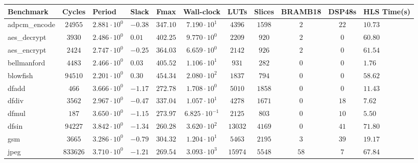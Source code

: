 \begin{tabular}{|l|c|HHc|c|c|c|c|cH|}
\hline
Benchmark     & Cycles       & Period                 & Slack     & Fmax       & Wall-clock              & LUTs      & Slices    & BRAMB18 & DSP48s  & HLS Time(s) \\
\hline
adpcm\_encode & $ 24955    $ & $ 2.881 \cdot 10^{0} $ & $ -0.38 $ & $ 347.10 $ & $ 7.190 \cdot 10^{1}  $ & $ 4396  $ & $ 1598  $ & $ 2   $ & $ 22  $ & $ 10.73   $ \\
aes\_decrypt  & $ 3930     $ & $ 2.486 \cdot 10^{0} $ & $ 0.01  $ & $ 402.25 $ & $ 9.770 \cdot 10^{0}  $ & $ 2209  $ & $ 920   $ & $ 2   $ & $ 0   $ & $ 60.80   $ \\
aes\_encrypt  & $ 2424     $ & $ 2.747 \cdot 10^{0} $ & $ -0.25 $ & $ 364.03 $ & $ 6.659 \cdot 10^{0}  $ & $ 2142  $ & $ 926   $ & $ 2   $ & $ 0   $ & $ 61.54   $ \\
bellmanford   & $ 4483     $ & $ 2.466 \cdot 10^{0} $ & $ 0.03  $ & $ 405.52 $ & $ 1.106 \cdot 10^{1}  $ & $ 931   $ & $ 282   $ & $ 0   $ & $ 0   $ & $ 1.76    $ \\
blowfish      & $ 94510    $ & $ 2.201 \cdot 10^{0} $ & $ 0.30  $ & $ 454.34 $ & $ 2.080 \cdot 10^{2}  $ & $ 1837  $ & $ 794   $ & $ 0   $ & $ 0   $ & $ 58.62   $ \\
dfadd         & $ 466      $ & $ 3.666 \cdot 10^{0} $ & $ -1.17 $ & $ 272.78 $ & $ 1.708 \cdot 10^{0}  $ & $ 5010  $ & $ 1858  $ & $ 0   $ & $ 0   $ & $ 11.43   $ \\
dfdiv         & $ 3562     $ & $ 2.967 \cdot 10^{0} $ & $ -0.47 $ & $ 337.04 $ & $ 1.057 \cdot 10^{1}  $ & $ 4278  $ & $ 1671  $ & $ 0   $ & $ 18  $ & $ 7.62    $ \\
dfmul         & $ 187      $ & $ 3.650 \cdot 10^{0} $ & $ -1.15 $ & $ 273.97 $ & $ 6.825 \cdot 10^{-1} $ & $ 2125  $ & $ 803   $ & $ 0   $ & $ 10  $ & $ 5.50    $ \\
dfsin         & $ 94227    $ & $ 3.842 \cdot 10^{0} $ & $ -1.34 $ & $ 260.28 $ & $ 3.620 \cdot 10^{2}  $ & $ 13032 $ & $ 4169  $ & $ 0   $ & $ 41  $ & $ 71.80   $ \\
gsm           & $ 3665     $ & $ 3.286 \cdot 10^{0} $ & $ -0.79 $ & $ 304.32 $ & $ 1.204 \cdot 10^{1}  $ & $ 5463  $ & $ 2195  $ & $ 3   $ & $ 39  $ & $ 19.17   $ \\
jpeg          & $ 833626   $ & $ 3.710 \cdot 10^{0} $ & $ -1.21 $ & $ 269.54 $ & $ 3.093 \cdot 10^{3}  $ & $ 15974 $ & $ 5548  $ & $ 58  $ & $ 7   $ & $ 67.84   $ \\

\end{tabular}

